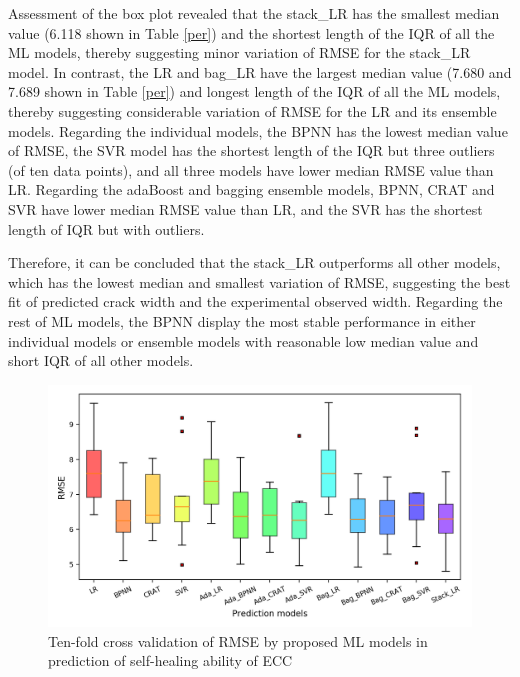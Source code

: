 \documentclass[11pt]{article}
\begin{document}
	
	Assessment of the box plot revealed that the stack\_LR has the smallest median value (6.118 shown in Table \ref{per}) and the shortest length of the IQR of all the ML models, thereby suggesting minor variation of RMSE for the stack\_LR model. In contrast, the LR and bag\_LR have the largest median value (7.680 and 7.689 shown in Table \ref{per}) and longest length of the IQR of all the ML models, thereby suggesting considerable variation of RMSE for the LR and its ensemble models. Regarding the individual models, the BPNN has the lowest median value of RMSE, the SVR model has the shortest length of the IQR but three outliers (of ten data points), and all three models have lower median RMSE value than LR. Regarding the adaBoost and bagging ensemble models, BPNN, CRAT and SVR have lower median RMSE value than LR, and the SVR has the shortest length of IQR but with outliers. 
	
	Therefore, it can be concluded that the stack\_LR outperforms all other models, which has the lowest median and smallest variation of RMSE, suggesting the best fit of predicted crack width and the experimental observed width. Regarding the rest of ML models, the BPNN display the most stable performance in either individual models or ensemble models with reasonable low median value and short IQR of all other models. 
	
	
	\begin{figure}[!h]
		\centering
		\includegraphics[width=\textwidth]{boxRMSE.png}
		\caption{Ten-fold cross validation of RMSE by proposed ML models in prediction of self-healing ability of ECC}
		\label{bar}
	\end{figure}
	
\end{document}
